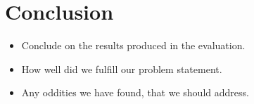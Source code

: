 \chapter{Conclusion} \label{ch:conclusion}

\begin{itemize}
	\item Conclude on the results produced in the evaluation.
	\item How well did we fulfill our problem statement.
	\item Any oddities we have found, that we should address.
\end{itemize}